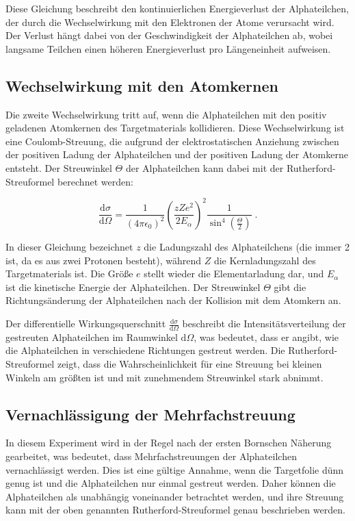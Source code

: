 Diese Gleichung beschreibt den kontinuierlichen Energieverlust der Alphateilchen, der durch die Wechselwirkung mit den Elektronen der Atome verursacht wird. Der Verlust hängt dabei von der Geschwindigkeit der Alphateilchen ab, wobei langsame Teilchen einen höheren Energieverlust pro Längeneinheit aufweisen.

\subsection*{Wechselwirkung mit den Atomkernen}
Die zweite Wechselwirkung tritt auf, wenn die Alphateilchen mit den positiv geladenen Atomkernen des Targetmaterials kollidieren. Diese Wechselwirkung ist eine Coulomb-Streuung, die aufgrund der elektrostatischen Anziehung zwischen der positiven Ladung der Alphateilchen und der positiven Ladung der Atomkerne entsteht. Der Streuwinkel $\Theta$ der Alphateilchen kann dabei mit der Rutherford-Streuformel berechnet werden:

\begin{equation}
\frac{\mathrm{d}\sigma}{\mathrm{d}\Omega} = \frac{1}{(4 \pi \epsilon_0)^2} \left( \frac{z Z e^2}{2 E_\alpha} \right)^2 \frac{1}{\sin^4\left(\frac{\Theta}{2}\right)}\; .
\label{eqn:Rutherford}
\end{equation}

In dieser Gleichung bezeichnet $z$ die Ladungszahl des Alphateilchens (die immer 2 ist, da es aus zwei Protonen besteht), während $Z$ die Kernladungszahl des Targetmaterials ist. Die Größe $e$ stellt wieder die Elementarladung dar, und $E_\alpha$ ist die kinetische Energie der Alphateilchen. Der Streuwinkel $\Theta$ gibt die Richtungsänderung der Alphateilchen nach der Kollision mit dem Atomkern an. 

Der differentielle Wirkungsquerschnitt $\frac{\mathrm{d}\sigma}{\mathrm{d}\Omega}$ beschreibt die Intensitätsverteilung der gestreuten Alphateilchen im Raumwinkel $\mathrm{d}\Omega$, was bedeutet, dass er angibt, wie die Alphateilchen in verschiedene Richtungen gestreut werden. Die Rutherford-Streuformel zeigt, dass die Wahrscheinlichkeit für eine Streuung bei kleinen Winkeln am größten ist und mit zunehmendem Streuwinkel stark abnimmt.

\subsection*{Vernachlässigung der Mehrfachstreuung}
In diesem Experiment wird in der Regel nach der ersten Bornschen Näherung gearbeitet, was bedeutet, dass Mehrfachstreuungen der Alphateilchen vernachlässigt werden. Dies ist eine gültige Annahme, wenn die Targetfolie dünn genug ist und die Alphateilchen nur einmal gestreut werden. Daher können die Alphateilchen als unabhängig voneinander betrachtet werden, und ihre Streuung kann mit der oben genannten Rutherford-Streuformel genau beschrieben werden.

